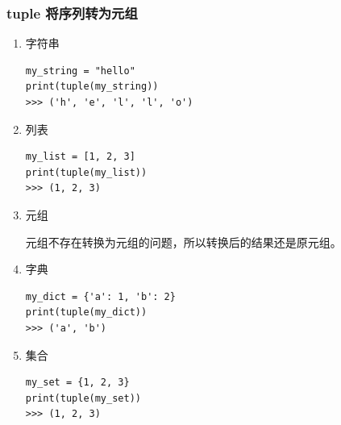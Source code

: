 \subsubsection{tuple 将序列转为元组}
\begin{enumerate}[label=\arabic*)]
    \item 字符串
\begin{lstlisting}[style=demostyle,numbers=none]
my_string = "hello"
print(tuple(my_string)) 
>>> ('h', 'e', 'l', 'l', 'o')
\end{lstlisting}

    \item 列表
\begin{lstlisting}[style=demostyle,numbers=none]
my_list = [1, 2, 3]
print(tuple(my_list))
>>> (1, 2, 3)
\end{lstlisting}

    \item 元组

    元组不存在转换为元组的问题，所以转换后的结果还是原元组。

    \item 字典
\begin{lstlisting}[style=demostyle,numbers=none]
my_dict = {'a': 1, 'b': 2}
print(tuple(my_dict))
>>> ('a', 'b')
\end{lstlisting}

    \item 集合
\begin{lstlisting}[style=demostyle,numbers=none]
my_set = {1, 2, 3}
print(tuple(my_set))
>>> (1, 2, 3)
\end{lstlisting}

\end{enumerate}

